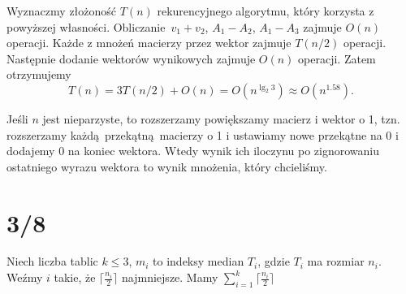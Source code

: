 \documentclass[a4paper, 12pt]{article}
\newcommand{\+}{\enspace}
\begin{document}
Wyznaczmy złożoność $T(n)$ rekurencyjnego algorytmu, który korzysta z
powyższej własności.
Obliczanie $v_1 + v_2$, $A_1 - A_2$, $A_1 - A_3$ zajmuje $O(n)$ operacji.
Każde z mnożeń macierzy przez wektor zajmuje $T(n/2)$ operacji.
Następnie dodanie wektorów wynikowych zajmuje $O(n)$ operacji.
Zatem otrzymujemy
$$T(n) = 3T(n/2) + O(n) = O(n^{\lg_2 3}) ≈ O(n^{1.58}).$$

Jeśli $n$ jest nieparzyste, to rozszerzamy powiększamy macierz i wektor o 1,
tzn. rozszerzamy każdą przekątną macierzy o 1 i ustawiamy nowe przekątne na 0
i dodajemy 0 na koniec wektora.
Wtedy wynik ich iloczynu po zignorowaniu ostatniego wyrazu wektora to
wynik mnożenia, który chcieliśmy.

\section*{3/8}
Niech liczba tablic $k ≤ 3$, $m_i$ to indeksy median $T_i$, gdzie $T_i$ ma rozmiar $n_i$.
Weźmy $i$ takie, że $⌈\frac{n_i}{2}⌉$ najmniejsze.
Mamy $∑_{i=1}^k ⌈\frac{n_i}{2}⌉$
\end{document}

